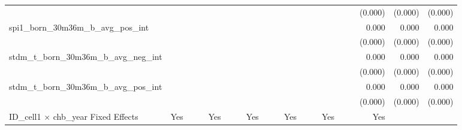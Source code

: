 \begin{tabular}{lrrrrrrrrrrrrrrrrrr}
                                            &              &              &              &              &              &              &              &              &               &              &              &               &              &              &               &      (0.000) &      (0.000) &       (0.000) \\ 
spi1\_born\_30m36m\_b\_avg\_pos\_int        &              &              &              &              &              &              &              &              &               &              &              &               &              &              &               &        0.000 &        0.000 &         0.000 \\ 
                                            &              &              &              &              &              &              &              &              &               &              &              &               &              &              &               &      (0.000) &      (0.000) &       (0.000) \\ 
stdm\_t\_born\_30m36m\_b\_avg\_neg\_int     &              &              &              &              &              &              &              &              &               &              &              &               &              &              &               &        0.000 &        0.000 &         0.000 \\ 
                                            &              &              &              &              &              &              &              &              &               &              &              &               &              &              &               &      (0.000) &      (0.000) &       (0.000) \\ 
stdm\_t\_born\_30m36m\_b\_avg\_pos\_int     &              &              &              &              &              &              &              &              &               &              &              &               &              &              &               &        0.000 &        0.000 &         0.000 \\ 
                                            &              &              &              &              &              &              &              &              &               &              &              &               &              &              &               &      (0.000) &      (0.000) &       (0.000) \\ 
\midrule
ID\_cell1 $\times$ chb\_year Fixed Effects  &          Yes &              &              &          Yes &              &              &          Yes &              &               &          Yes &              &               &          Yes &              &               &          Yes &              &               \\ 

\end{tabular}
